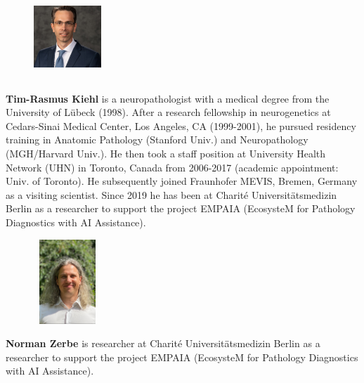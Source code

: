 
 \begin{figure} 
    \includegraphics[width=1in,height=1.25in,clip,keepaspectratio]{bio-images/kiehl.jpg}
  \end{figure}\par
  \textbf{Tim-Rasmus Kiehl} is a neuropathologist with a medical degree from the University of Lübeck (1998). After a research fellowship in neurogenetics at Cedars-Sinai Medical Center, Los Angeles, CA (1999-2001), he pursued residency training in Anatomic Pathology (Stanford Univ.) and Neuropathology (MGH/Harvard Univ.). He then took a staff position at University Health Network (UHN) in Toronto, Canada from 2006-2017 (academic appointment: Univ. of Toronto). He subsequently joined Fraunhofer MEVIS, Bremen, Germany as a visiting scientist. Since 2019 he has been at Charité Universitätsmedizin Berlin as a researcher to support the project EMPAIA (EcosysteM for Pathology Diagnostics with AI Assistance).\par
  
  \begin{figure} 
    \includegraphics[width=1in,height=1.25in,clip,keepaspectratio]{bio-images/zerbe.jpg}
  \end{figure}\par
  \textbf{Norman Zerbe} is researcher at Charité Universitätsmedizin Berlin as a researcher to support the project EMPAIA (EcosysteM for Pathology Diagnostics with AI Assistance).\par

